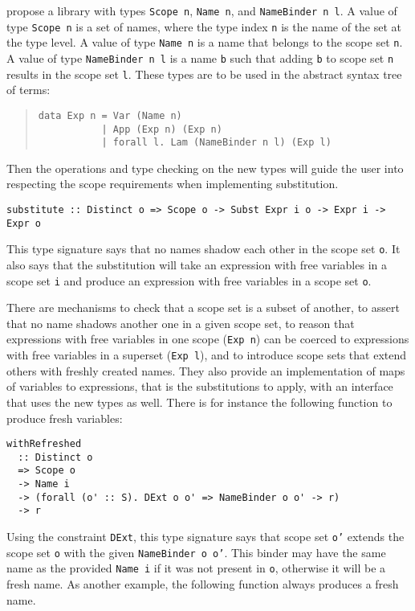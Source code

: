 \documentclass[sigconf, review]{acmart}
\newcommand{\tc}[1]{{\small\texttt{#1}}}
\begin{document}
 propose a library with types \tc{Scope n}, \tc{Name n}, and
\tc{Name\-Binder n l}. A value of type \tc{Scope n} is a set of names, where
the type index \tc{n} is the name of the set at the type level. A value of type \tc{Name n} is a name that
belongs to the scope set \tc{n}. A value of type \tc{NameBinder n l} is
a name \tc{b} such that adding \tc{b} to scope set \tc{n} results in the scope
set \tc{l}.
These types are to be used in
the abstract syntax tree of terms:

\begin{quotation}
\begin{verbatim}
data Exp n = Var (Name n)
           | App (Exp n) (Exp n)
           | forall l. Lam (NameBinder n l) (Exp l)
\end{verbatim}
\end{quotation}

Then the operations and type checking on the new types will guide the user into
respecting the scope requirements when implementing substitution.

\begin{verbatim}
substitute :: Distinct o => Scope o -> Subst Expr i o -> Expr i -> Expr o
\end{verbatim}

This type signature says that no names shadow each other in the scope set \tc{o}.
It also says that the substitution will take an expression with free variables in
a scope set \tc{i} and produce an expression with free variables in a scope set
\tc{o}.

There
are mechanisms to check that a scope set is a subset of another, to assert that no
name shadows another one in a given scope set, to reason that expressions
with free variables in one scope (\tc{Exp n}) can be coerced to expressions with
free variables in a superset (\tc{Exp l}), and to introduce scope sets that extend
others with freshly created names. They also provide an implementation of maps of
variables to expressions, that is the substitutions to apply, with an interface
that uses the new types as well. There is for instance the following function to
produce fresh variables:

\begin{verbatim}
withRefreshed
  :: Distinct o
  => Scope o
  -> Name i
  -> (forall (o' :: S). DExt o o' => NameBinder o o' -> r)
  -> r
\end{verbatim}

Using the constraint \tc{DExt}, this type signature says that scope set \tc{o'}
extends the scope set \tc{o} with the given \tc{NameBinder o o'}. This binder
may have the same name as the provided \tc{Name i} if it was not present in
\tc{o}, otherwise it will be a fresh name. As another example, the following
function always produces a fresh name.
\end{document}
